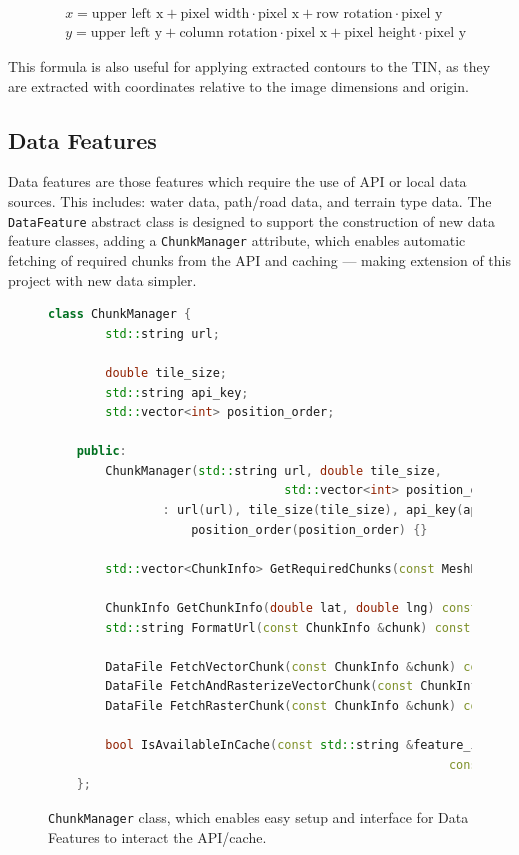 \documentclass[12pt]{article}
\begin{document}
\begin{align}
   & x = \text{upper left x} + \text{pixel width} \cdot \text{pixel x} + \text{row rotation} \cdot \text{pixel y}     \\
   & y = \text{upper left y} + \text{column rotation} \cdot \text{pixel x} + \text{pixel height} \cdot \text{pixel y}
\end{align}

This formula is also useful for applying extracted contours to the TIN, as they are extracted with coordinates relative to the image dimensions and origin.

\subsection{Data Features}

Data features are those features which require the use of API or local data sources. This includes: water data, path/road data, and terrain type data. The \texttt{DataFeature} abstract class is designed to support the construction of new data feature classes, adding a \texttt{ChunkManager} attribute, which enables automatic fetching of required chunks from the API and caching --- making extension of this project with new data simpler.

\begin{figure}[H]
  \centering
  \begin{lstlisting}[language=c++]
	class ChunkManager {
		std::string url;
	
		double tile_size;
		std::string api_key;
		std::vector<int> position_order;
	
	public:
		ChunkManager(std::string url, double tile_size,
								 std::vector<int> position_order, std::string api_key)
				: url(url), tile_size(tile_size), api_key(api_key),
					position_order(position_order) {}

		std::vector<ChunkInfo> GetRequiredChunks(const MeshBoundary &boundary) const;

		ChunkInfo GetChunkInfo(double lat, double lng) const;
		std::string FormatUrl(const ChunkInfo &chunk) const;
	
		DataFile FetchVectorChunk(const ChunkInfo &chunk) const;
		DataFile FetchAndRasterizeVectorChunk(const ChunkInfo &chunk,
		DataFile FetchRasterChunk(const ChunkInfo &chunk) const;

		bool IsAvailableInCache(const std::string &feature_id,
														const ChunkInfo &chunk);
	};
	\end{lstlisting}
  \vspace{-2em}
  \caption{\texttt{ChunkManager} class, which enables easy setup and interface for Data Features to  interact the API/cache.}
  \label{lst:chunkmanager}
\end{figure}
\end{document}
